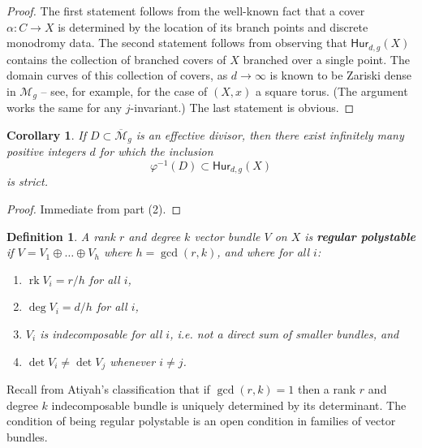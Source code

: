 \documentclass[reqno, 11pt]{amsart}
\newtheorem{corollary}[theorem]{Corollary}
\newtheorem{definition}[theorem]{Definition}
\newcommand{\HdgX}{\mathsf{Hur}_{d,g}(X)}
\DeclareMathOperator{\rk}{rk}
\newcommand{\Mgbar}{\overline{\mathcal{M}}_{g}}
\newcommand{\Hur}[2]{\mathsf{Hur}_{#1,#2}}
\begin{document}
\begin{proof}
    The first statement follows from the well-known fact that a cover $\alpha: C \to X$ is determined by the location of its branch points and discrete monodromy data.  The second statement follows from observing that $\Hur{d}{g}(X)$ contains the collection of branched covers of $X$ branched over a single point.  The domain curves of this collection of covers, as $d \to \infty$ is known to be Zariski dense in $\mathcal{M}_{g}$ -- see, for example, \cite{chen2011square} for the case of $(X,x)$ a square torus.  (The argument works the same for any $j$-invariant.)   The last statement is obvious.
\end{proof}

\begin{corollary}
    \label{corollary:divisor} If $D \subset \Mgbar$ is an effective divisor, then there exist infinitely many positive integers $d$ for which the inclusion \[\varphi^{-1}(D) \subset \HdgX\] is strict.
\end{corollary}

\begin{proof}
    Immediate from  part (2).
\end{proof}

\begin{definition}
    \label{definition:regularpolystable} A rank $r$ and  degree $k$ vector bundle $V$ on $X$ is {\bf regular polystable} if $V = V_{1} \oplus \dots \oplus V_{h}$ where $h = \gcd(r,k)$, and where for all $i$:
    \begin{enumerate}
        \item $\rk V_{i} = r/h$ for all $i$,
        \item $\deg V_{i} = d/h$ for all $i$, 
        \item $V_{i}$ is indecomposable for all $i$, i.e. not a direct sum of smaller bundles, and
        \item $\det V_{i} \neq \det V_{j}$ whenever $i \neq j$.
    \end{enumerate} 
\end{definition}

Recall from Atiyah's classification that if $\gcd(r,k) = 1$ then a rank $r$ and degree $k$ indecomposable bundle is uniquely determined by its determinant.  The condition of being regular polystable is an open condition in families of vector bundles.
\end{document}
